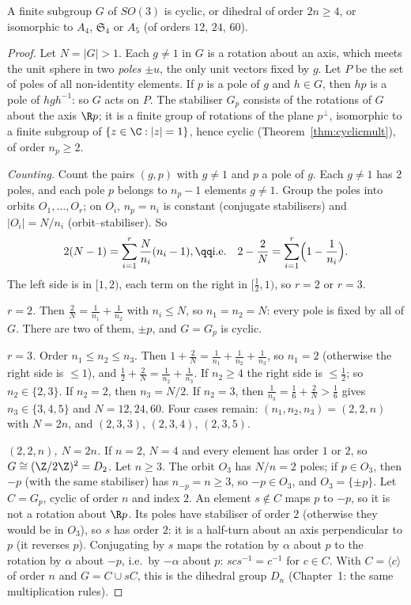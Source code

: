 \begin{theorem}\label{thm:finiteso3}
A finite subgroup $G$ of $SO(3)$ is cyclic, or dihedral of order $2n\ge4$, or isomorphic to $A_4$, $\mathfrak S_4$ or $A_5$ (of orders $12$, $24$, $60$).
\end{theorem}
\begin{proof}
Let $N=|G|>1$. Each $g\ne1$ in $G$ is a rotation about an axis, which meets the unit sphere in two \emph{poles} $\pm u$, the only unit vectors fixed by $g$. Let $P$ be the set of poles of all non-identity elements. If $p$ is a pole of $g$ and $h\in G$, then $hp$ is a pole of $hgh^{-1}$: so $G$ acts on $P$. The stabiliser $G_p$ consists of the rotations of $G$ about the axis $\R p$; it is a finite group of rotations of the plane $p^\perp$, isomorphic to a finite subgroup of $\{z\in\C:|z|=1\}$, hence cyclic (Theorem~\ref{thm:cyclicmult}), of order $n_p\ge2$.

\emph{Counting.} Count the pairs $(g,p)$ with $g\ne1$ and $p$ a pole of $g$. Each $g\ne1$ has $2$ poles, and each pole $p$ belongs to $n_p-1$ elements $g\ne1$. Group the poles into orbits $O_1,\dots,O_r$; on $O_i$, $n_p=n_i$ is constant (conjugate stabilisers) and $|O_i|=N/n_i$ (orbit--stabiliser). So
\[
\begin{gathered}2(N-1)=\sum_{i=1}^r\frac N{n_i}(n_i-1),\qq\text{i.e.}\quad2-\frac2N=\sum_{i=1}^r\Bigl(1-\frac1{n_i}\Bigr).\end{gathered}
\]
The left side is in $[1,2)$, each term on the right in $[\frac12,1)$, so $r=2$ or $r=3$.

\emph{$r=2$.} Then $\frac2N=\frac1{n_1}+\frac1{n_2}$ with $n_i\le N$, so $n_1=n_2=N$: every pole is fixed by all of $G$. There are two of them, $\pm p$, and $G=G_p$ is cyclic.

\emph{$r=3$.} Order $n_1\le n_2\le n_3$. Then $1+\frac2N=\frac1{n_1}+\frac1{n_2}+\frac1{n_3}$, so $n_1=2$ (otherwise the right side is $\le1$), and $\frac12+\frac2N=\frac1{n_2}+\frac1{n_3}$. If $n_2\ge4$ the right side is $\le\frac12$; so $n_2\in\{2,3\}$. If $n_2=2$, then $n_3=N/2$. If $n_2=3$, then $\frac1{n_3}=\frac16+\frac2N>\frac16$ gives $n_3\in\{3,4,5\}$ and $N=12,24,60$. Four cases remain: $(n_1,n_2,n_3)=(2,2,n)$ with $N=2n$, and $(2,3,3)$, $(2,3,4)$, $(2,3,5)$.

\emph{$(2,2,n)$, $N=2n$.} If $n=2$, $N=4$ and every element has order $1$ or $2$, so $G\cong(\Z/2\Z)^2=D_2$. Let $n\ge3$. The orbit $O_3$ has $N/n=2$ poles; if $p\in O_3$, then $-p$ (with the same stabiliser) has $n_{-p}=n\ge3$, so $-p\in O_3$, and $O_3=\{\pm p\}$. Let $C=G_p$, cyclic of order $n$ and index $2$. An element $s\notin C$ maps $p$ to $-p$, so it is not a rotation about $\R p$. Its poles have stabiliser of order $2$ (otherwise they would be in $O_3$), so $s$ has order $2$: it is a half-turn about an axis perpendicular to $p$ (it reverses $p$). Conjugating by $s$ maps the rotation by $\alpha$ about $p$ to the rotation by $\alpha$ about $-p$, i.e.\ by $-\alpha$ about $p$: $scs^{-1}=c^{-1}$ for $c\in C$. With $C=\langle c\rangle$ of order $n$ and $G=C\cup sC$, this is the dihedral group $D_n$ (Chapter~1: the same multiplication rules).


\end{proof}

